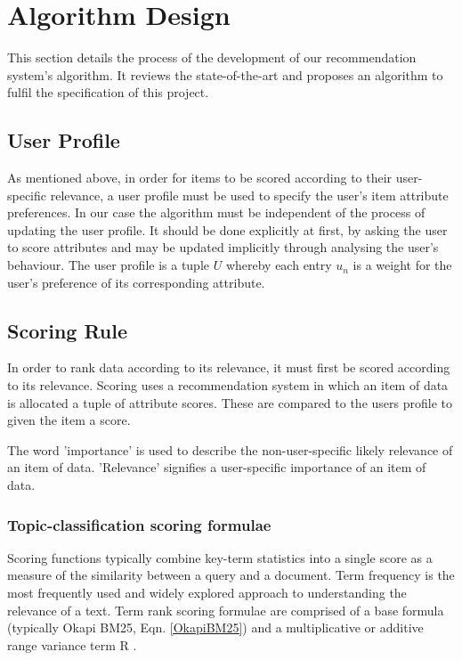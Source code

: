 \chapter{Algorithm Design}

This section details the process of the development of our recommendation system's algorithm. It reviews the state-of-the-art and proposes an algorithm to fulfil the specification of this project. 

\section{User Profile}

As mentioned above, in order for items to be scored according to their user-specific relevance, a user profile must be used to specify the user's item attribute preferences. In our case the algorithm must be independent of the process of updating the user profile. It should be done explicitly at first, by asking the user to score attributes and may be updated implicitly through analysing the user's behaviour. The user profile is a tuple $U$ whereby each entry $u_n$ is a weight for the user's preference of its corresponding attribute.

\section{Scoring Rule}

In order to rank data according to its relevance, it must first be scored according to its relevance. Scoring uses a recommendation system in which an item of data is allocated a tuple of attribute scores. These are compared to the users profile to given the item a score. 

The word 'importance' is used to describe the non-user-specific likely relevance of an item of data. 'Relevance' signifies a user-specific importance of an item of data.

\subsection{Topic-classification scoring formulae}

Scoring functions typically combine key-term statistics into a single score as a measure of the similarity between a query and a document.
Term frequency is the most frequently used and widely explored approach to understanding the relevance of a text. Term rank scoring formulae are comprised of a base formula (typically Okapi BM25, Eqn. \ref{OkapiBM25}) and a multiplicative or additive range variance term R \cite{OkapiBM25Paper}.

